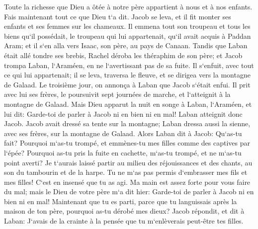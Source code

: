 \verse Toute la richesse que Dieu a ôtée à notre père appartient à nous et à nos enfants. Fais maintenant tout ce que Dieu t`a dit. 
\verse Jacob se leva, et il fit monter ses enfants et ses femmes sur les chameaux. 
\verse Il emmena tout son troupeau et tous les biens qu`il possédait, le troupeau qui lui appartenait, qu`il avait acquis à Paddan Aram; et il s`en alla vers Isaac, son père, au pays de Canaan. 
\verse Tandis que Laban était allé tondre ses brebis, Rachel déroba les théraphim de son père; 
\verse et Jacob trompa Laban, l`Araméen, en ne l`avertissant pas de sa fuite. 
\verse Il s`enfuit, avec tout ce qui lui appartenait; il se leva, traversa le fleuve, et se dirigea vers la montagne de Galaad. 
\verse Le troisième jour, on annonça à Laban que Jacob s`était enfui. 
\verse Il prit avec lui ses frères, le poursuivit sept journées de marche, et l`atteignit à la montagne de Galaad. 
\verse Mais Dieu apparut la nuit en songe à Laban, l`Araméen, et lui dit: Garde-toi de parler à Jacob ni en bien ni en mal! 
\verse Laban atteignit donc Jacob. Jacob avait dressé sa tente sur la montagne; Laban dressa aussi la sienne, avec ses frères, sur la montagne de Galaad. 
\verse Alors Laban dit à Jacob: Qu`as-tu fait? Pourquoi m`as-tu trompé, et emmènes-tu mes filles comme des captives par l`épée? 
\verse Pourquoi as-tu pris la fuite en cachette, m`as-tu trompé, et ne m`as-tu point averti? Je t`aurais laissé partir au milieu des réjouissances et des chants, au son du tambourin et de la harpe. 
\verse Tu ne m`as pas permis d`embrasser mes fils et mes filles! C`est en insensé que tu as agi. 
\verse Ma main est assez forte pour vous faire du mal; mais le Dieu de votre père m`a dit hier: Garde-toi de parler à Jacob ni en bien ni en mal! 
\verse Maintenant que tu es parti, parce que tu languissais après la maison de ton père, pourquoi as-tu dérobé mes dieux? 
\verse Jacob répondit, et dit à Laban: J`avais de la crainte à la pensée que tu m`enlèverais peut-être tes filles. 
